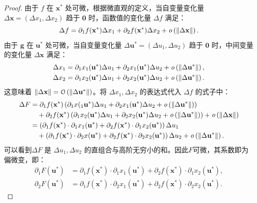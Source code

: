 \documentclass[12pt,UTF8,fontset=none]{ctexbook}
\begin{document}
\begin{proof}
由于 $f$ 在 $\mathbf{x}^*$ 处可微，根据微直观的定义，当自变量变化量 $\Delta \mathbf{x} = (\Delta x_1, \Delta x_2)$ 趋于 $\mathbf{0}$ 时，函数值的变化量 $\Delta f$ 满足：
$$ \Delta f = \partial_1 f(\mathbf{x}^*) \Delta x_1 + \partial_2 f(\mathbf{x}^*) \Delta x_2 + \mathit{o}\left(\|\Delta \mathbf{x}\|\right). $$
由于 $\mathbf{g}$ 在 $\mathbf{u}^*$ 处可微，当自变量变化量 $\Delta \mathbf{u}^* = (\Delta u_1, \Delta u_2)$ 趋于 $\mathbf{0}$ 时，中间变量的变化量 $\Delta \mathbf{x}$ 满足：
\begin{align*}
\Delta x_1 &= \partial_1 x_1(\mathbf{u}^*) \Delta u_1 + \partial_2 x_1(\mathbf{u}^*) \Delta u_2 + \mathit{o}\left(\|\Delta \mathbf{u}^*\|\right), \\
\Delta x_2 &= \partial_1 x_2(\mathbf{u}^*) \Delta u_1 + \partial_2 x_2(\mathbf{u}^*) \Delta u_2 + \mathit{o}\left(\|\Delta \mathbf{u}^*\|\right).
\end{align*}
这意味着 $\|\Delta \mathbf{x}\| = \mathcal{O}\left(\|\Delta \mathbf{u}^*\|\right)$。将 $\Delta x_1, \Delta x_2$ 的表达式代入 $\Delta f$ 的式子中：
\begin{align*}
\Delta F &= \partial_1 f(\mathbf{x}^*) \left( \partial_1 x(_1\mathbf{u}^*) \Delta u_1 + \partial_2 x_1(\mathbf{u}^*) \Delta u_2 + \mathit{o}\left(\|\Delta \mathbf{u}^*\|\right) \right) \\
&\quad + \partial_2 f(\mathbf{x}^*) \left( \partial_1 x_2(\mathbf{u}^*) \Delta u_1 + \partial_2 x_2(\mathbf{u}^*) \Delta u_2 + \mathit{o}\left(\|\Delta \mathbf{u}^*\|\right) \right) + \mathit{o}\left(\|\Delta \mathbf{x}\|\right) \\
&= \left( \partial_1 f(\mathbf{x}^*) \cdot \partial_1 x_1(\mathbf{u}^*) + \partial_2 f(\mathbf{x}^*) \cdot \partial_1 x_2(\mathbf{u}^*) \right) \Delta u_1 \\
&\quad + \left( \partial_1 f(\mathbf{x}^*) \cdot \partial_2 x(\mathbf{u}^*) + \partial_2 f(\mathbf{x}^*) \cdot \partial_2 x_2(\mathbf{u}^*) \right) \Delta u_2 + \mathit{o}\left(\|\Delta \mathbf{u}^*\|\right).
\end{align*}
可以看到$\Delta F$ 是 $\Delta u_1, \Delta u_2$ 的直组合与高阶无穷小的和。因此$F$可微，其系数即为偏微变，即：
\begin{align*}
    \partial_1 F(\mathbf{u}^*) &= \partial_1 f(\mathbf{x}^*) \cdot \partial_1 x_1(\mathbf{u}^*) + \partial_2 f(\mathbf{x}^*) \cdot \partial_1 x_2(\mathbf{u}^*), \\
    \partial_2 F(\mathbf{u}^*) &= \partial_1 f(\mathbf{x}^*) \cdot \partial_2 x_1(\mathbf{u}^*) + \partial_2 f(\mathbf{x}^*) \cdot \partial_2 x_2(\mathbf{u}^*).
\end{align*}
\end{proof}
\end{document}
